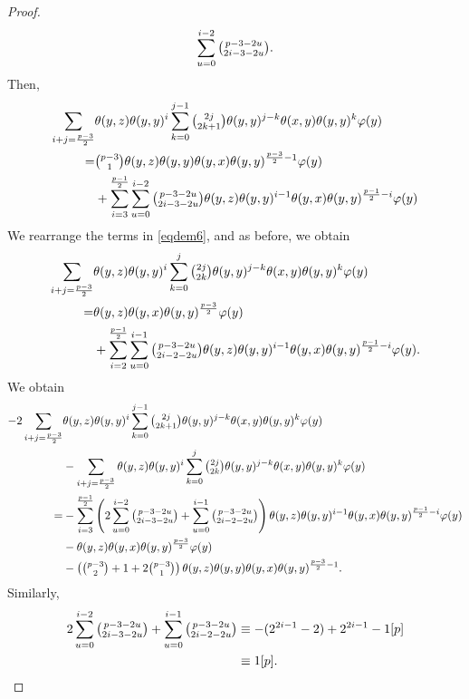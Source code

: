 \documentclass[11pt, twoside]{article}
\begin{document}
\begin{proof}
\begin{align*}
        \sum\limits_{u=0}^{i-2}\tbinom{p-3-2u}{2i-3-2u}.
    \end{align*} Then, \begin{align*}
         \sum\limits_{i+j=\frac{p-3}{2}}&\theta(y,z)\theta(y,y)^i\sum\limits_{k=0}^{j-1}\tbinom{2j}{2k+1}\theta(y,y)^{j-k}\theta(x,y)\theta(y,y)^{k}\varphi(y)\\ =& \tbinom{p-3}{1}\theta(y,z)\theta(y,y)\theta(y,x)\theta(y,y)^{\frac{p-3}{2}-1}\varphi(y)\\ &+ \sum\limits_{i=3}^{\frac{p-1}{2}}\sum\limits_{u=0}^{i-2}\tbinom{p-3-2u}{2i-3-2u}\theta(y,z)\theta(y,y)^{i-1}\theta(y,x)\theta(y,y)^{\frac{p-1}{2}-i}\varphi(y)
    \end{align*} We rearrange the terms in \eqref{eqdem6}, and as before, we obtain \begin{align*}
        \sum\limits_{i+j=\frac{p-3}{2}}&\theta(y,z)\theta(y,y)^i\sum\limits_{k=0}^j\tbinom{2j}{2k}\theta(y,y)^{j-k}\theta(x,y)\theta(y,y)^{k}\varphi(y)\\ =& \theta(y,z)\theta(y,x)\theta(y,y)^\frac{p-3}{2}\varphi(y) \\ &+ \sum\limits_{i=2}^\frac{p-1}{2} \sum\limits_{u=0}^{i-1}\tbinom{p-3-2u}{2i-2-2u}\theta(y,z)\theta(y,y)^{i-1}\theta(y,x)\theta(y,y)^{\frac{p-1}{2}-i}\varphi(y).
    \end{align*} We obtain \begin{align*}
        -2 \sum\limits_{i+j=\frac{p-3}{2}}&\theta(y,z)\theta(y,y)^i\sum\limits_{k=0}^{j-1}\tbinom{2j}{2k+1}\theta(y,y)^{j-k}\theta(x,y)\theta(y,y)^{k}\varphi(y) \\ & -\sum\limits_{i+j=\frac{p-3}{2}}\theta(y,z)\theta(y,y)^i\sum\limits_{k=0}^j\tbinom{2j}{2k}\theta(y,y)^{j-k}\theta(x,y)\theta(y,y)^{k}\varphi(y)\\ = &- \sum\limits_{i=3}^{\frac{p-1}{2}}\left(2\sum\limits_{u=0}^{i-2}\tbinom{p-3-2u}{2i-3-2u}+\sum\limits_{u=0}^{i-1}\tbinom{p-3-2u}{2i-2-2u}\right)\theta(y,z)\theta(y,y)^{i-1}\theta(y,x)\theta(y,y)^{\frac{p-1}{2}-i}\varphi(y)\\ &-\theta(y,z)\theta(y,x)\theta(y,y)^\frac{p-3}{2}\varphi(y) \\&- \left(\tbinom{p-3}{2}+1+2\tbinom{p-3}{1}\right)\theta(y,z)\theta(y,y)\theta(y,x)\theta(y,y)^{\frac{p-3}{2}-1} .
    \end{align*} Similarly, \begin{align*}
        2\sum\limits_{u=0}^{i-2}\tbinom{p-3-2u}{2i-3-2u}+\sum\limits_{u=0}^{i-1}\tbinom{p-3-2u}{2i-2-2u}&\equiv -(2^{2i-1}-2)+2^{2i-1}-1[p]\\&\equiv 1[p]. 

\end{align*}
\end{proof}
\end{document}
